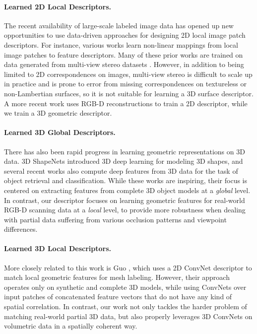 \documentclass[10pt,twocolumn,letterpaper]{article}
\newcommand{\mypara}{\vspace*{-3mm}\paragraph}
\begin{document}
\mypara{Learned 2D Local Descriptors.}
The recent availability of large-scale labeled image data has opened up new opportunities to use data-driven approaches for designing 2D local image patch descriptors.
For instance, various works \cite{simonyan2014learning,simo2015discriminative,yi2016lift,han2015matchnet,vzbontar2014computing,han2015matchnet} learn non-linear mappings from local image patches to feature descriptors.
Many of these prior works are trained on data generated from multi-view stereo datasets \cite{brown2011discriminative}. However, in addition to being limited to 2D correspondences on images, multi-view stereo is difficult to scale up in practice and is prone to error from missing correspondences on textureless or non-Lambertian surfaces, so it is not suitable for learning a 3D surface descriptor. A more recent work \cite{schmidt2017self} uses RGB-D reconstructions to train a 2D descriptor, while we train a 3D geometric descriptor.




\mypara{Learned 3D Global Descriptors.}
There has also been rapid progress in learning geometric representations on 3D data. 
3D ShapeNets \cite{3DShapeNets} introduced 3D deep learning for modeling 3D shapes, and several recent works \cite{maturana_icra_2014,fang20153d,song2015deep} also compute deep features from 3D data for the task of object retrieval and classification. 
While these works are inspiring, their focus is centered on extracting features from complete 3D object models at a \textit{global} level. In contrast, our descriptor focuses on learning geometric features for real-world RGB-D scanning data at a \textit{local} level, to provide more robustness when dealing with partial data suffering from various occlusion patterns and viewpoint differences.

\mypara{Learned 3D Local Descriptors.}
More closely related to this work is Guo \etal \cite{guo20153d}, which uses a 2D ConvNet descriptor to match local geometric features for mesh labeling. However, their approach operates only on synthetic and complete 3D models, while using ConvNets over input patches of concatenated feature vectors that do not have any kind of spatial correlation. In contrast, our work not only tackles the harder problem of matching real-world partial 3D data, but also properly leverages 3D ConvNets on volumetric data in a spatially coherent way.
\end{document}
